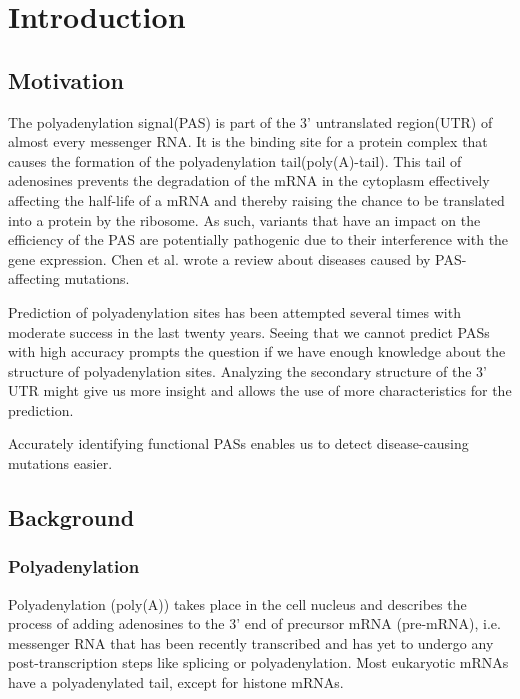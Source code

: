 \section{Introduction}

\subsection{Motivation}
The polyadenylation signal(PAS) is part of the 3' untranslated region(UTR) of almost every messenger RNA. It is the binding site for a protein complex that causes the formation of the polyadenylation tail(poly(A)-tail). This tail of adenosines prevents the degradation of the mRNA in the cytoplasm effectively affecting the half-life of a mRNA and thereby raising the chance to be translated into a protein by the ribosome. As such, variants that have an impact on the efficiency of the PAS are potentially pathogenic due to their interference with the gene expression. Chen et al. wrote a review about diseases caused by PAS-affecting mutations.  

Prediction of polyadenylation sites has been attempted several times with moderate success in the last twenty years.  Seeing that we cannot predict PASs with high accuracy prompts the question if we have enough knowledge about the structure of polyadenylation sites. Analyzing the secondary structure of the 3' UTR might give us more insight and allows the use of more characteristics for the prediction.

Accurately identifying functional PASs enables us to detect disease-causing mutations easier.  


\subsection{Background}

\subsubsection{Polyadenylation}
\label{Polyadenylation}
Polyadenylation (poly(A)) takes place in the cell nucleus and describes the process of adding adenosines to the 3' end of precursor mRNA (pre-mRNA), i.e. messenger RNA that has been recently transcribed and has yet to undergo any post-transcription steps like splicing or polyadenylation. Most eukaryotic mRNAs have a polyadenylated tail, except for histone mRNAs. 

